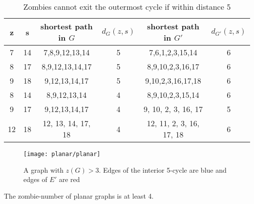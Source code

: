 \begin{table}
\centering
\begin{tabular}{c | c | c | c | c | c}
z & s & shortest path in $G$ & $d_{G}(z,s)$ & shortest path in $G'$ & $d_{G'}(z,s)$  \\
\hline
7 & 14 & 7,8,9,12,13,14 & 5 & 7,6,1,2,3,15,14 & 6 \\
8 & 17 & 8,9,12,13,14,17 & 5 & 8,9,10,2,3,16,17 & 6 \\
9 & 18 & 9,12,13,14,17 & 5 & 9,10,2,3,16,17,18 & 6 \\
\hline
8 & 14 & 8,9,12,13,14 & 4 & 8,9,10,2,3,15,14 & 6 \\
9 & 17 & 9,12,13,14,17 & 4 & 9, 10, 2, 3, 16, 17 & 5 \\
12 & 18 & 12, 13, 14, 17, 18 & 4 & 12, 11, 2, 3, 16, 17, 18 & 6
\end{tabular}
\caption{Zombies cannot exit the outermost cycle if within distance 5\label{table outermost cycle}}
\end{table}

\begin{figure}
\centering
\texttt{[image: planar/planar]}
\caption{A graph with $z(G) > 3$. Edges of the interior 5-cycle are blue and edges of $E'$ are red \label{fig:planar}}
\end{figure}

\begin{theorem}
  The zombie-number of planar graphs is at least 4.
\end{theorem}

